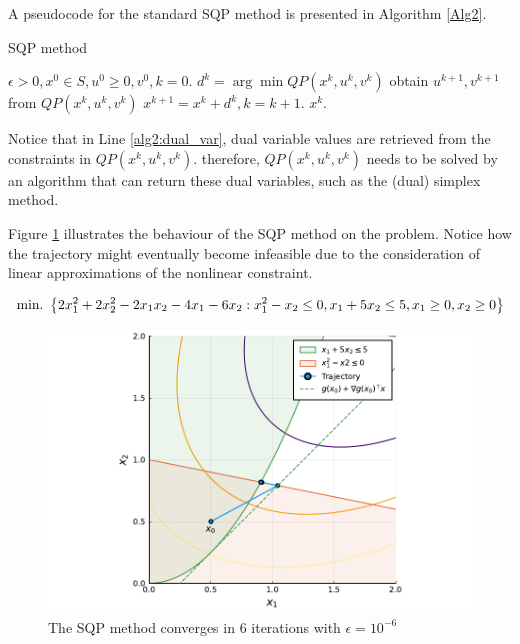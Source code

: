 A pseudocode for the standard SQP  method is presented in Algorithm \ref{Alg2}.

\captionsetup[algorithm]{font=footnotesize}
\begin{algorithm}[H]
\caption{SQP method} \label{Alg2}
\begin{algorithmic}[1] %
	 $\epsilon > 0, x^0 \in S, u^0 \geq0, v^0, k = 0$. 
	    \State $d^k = \arg\min QP(x^k, u^k, v^k)$
		\State obtain $u^{k+1}, v^{k+1}$ from $QP(x^k, u^k, v^k)$ \label{alg2:dual_var}
	    \State $x^{k+1} = x^k + d^k,  k = k+1$.
	\EndWhile
	 $x^k$.
\end{algorithmic}
\end{algorithm}
Notice that in Line \ref{alg2:dual_var}, dual variable values are retrieved from the constraints in $QP(x^k, u^k, v^k)$. therefore, $QP(x^k, u^k, v^k)$ needs to be solved by an algorithm that can return these dual variables, such as the (dual) simplex method. 

Figure \ref{fig:sqp_example} illustrates the behaviour of the SQP method on the problem. Notice how the trajectory might eventually become infeasible due to the consideration of linear approximations of the nonlinear constraint. 

$$
\mathop{\text{min.~}}\left\{ 2x_1^2 + 2x_2^2 - 2x_1x_2 - 4x_1 - 6x_2 : x_1^2 - x_2 \leq 0, x_1 + 5x_2 \leq 5, x_1 \geq 0, x_2 \geq 0 \right \}
$$
\begin{figure}
	\includegraphics[width=\textwidth]{part_2/chapter_11/figures/SQP_example.pdf}
	\caption{The SQP method converges in 6 iterations with $\epsilon = 10^{-6}$} \label{fig:sqp_example}		
\end{figure}


